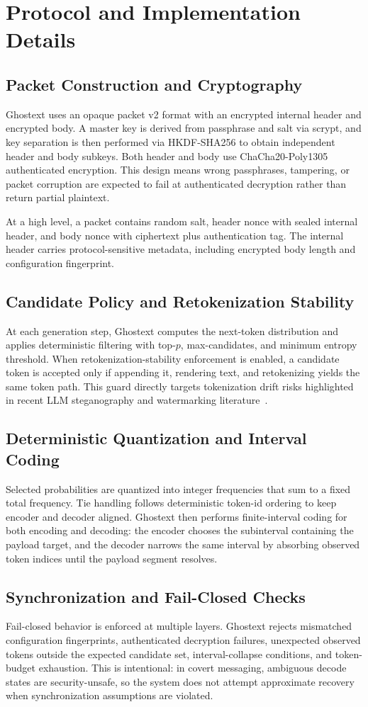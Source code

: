 \section{Protocol and Implementation Details}
\subsection{Packet Construction and Cryptography}
Ghostext uses an opaque packet v2 format with an encrypted internal header and encrypted body. A master key is derived from passphrase and salt via scrypt, and key separation is then performed via HKDF-SHA256 to obtain independent header and body subkeys. Both header and body use ChaCha20-Poly1305 authenticated encryption. This design means wrong passphrases, tampering, or packet corruption are expected to fail at authenticated decryption rather than return partial plaintext.

At a high level, a packet contains random salt, header nonce with sealed internal header, and body nonce with ciphertext plus authentication tag. The internal header carries protocol-sensitive metadata, including encrypted body length and configuration fingerprint.

\subsection{Candidate Policy and Retokenization Stability}
At each generation step, Ghostext computes the next-token distribution and applies deterministic filtering with top-$p$, max-candidates, and minimum entropy threshold. When retokenization-stability enforcement is enabled, a candidate token is accepted only if appending it, rendering text, and retokenizing yields the same token path. This guard directly targets tokenization drift risks highlighted in recent LLM steganography and watermarking literature~\cite{DBLP:conf/emnlp/YanM25}.

\subsection{Deterministic Quantization and Interval Coding}
Selected probabilities are quantized into integer frequencies that sum to a fixed total frequency. Tie handling follows deterministic token-id ordering to keep encoder and decoder aligned. Ghostext then performs finite-interval coding for both encoding and decoding: the encoder chooses the subinterval containing the payload target, and the decoder narrows the same interval by absorbing observed token indices until the payload segment resolves.

\subsection{Synchronization and Fail-Closed Checks}
Fail-closed behavior is enforced at multiple layers. Ghostext rejects mismatched configuration fingerprints, authenticated decryption failures, unexpected observed tokens outside the expected candidate set, interval-collapse conditions, and token-budget exhaustion. This is intentional: in covert messaging, ambiguous decode states are security-unsafe, so the system does not attempt approximate recovery when synchronization assumptions are violated.
